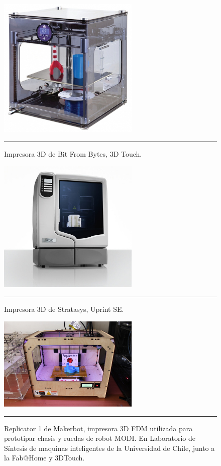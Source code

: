 \begin{figure}[htbp]
	\centering
		\includegraphics[width=0.6\textwidth]{./Figures/3dtouch.jpg}
		\rule{35em}{0.5pt}
	\caption[3DTouch]{Impresora 3D de Bit From Bytes, 3D Touch.}
	\label{fig:3Dtouch}
\end{figure}	

\begin{figure}[htbp]
	\centering
		\includegraphics[width=0.6\textwidth]{./Figures/uprint.jpg}
		\rule{35em}{0.5pt}
	\caption[uprint]{Impresora 3D de Stratasys, Uprint SE.}
	\label{fig:uprint}
\end{figure}	


\begin{figure}[htbp]
	\centering
		\includegraphics[width=0.6\textwidth]{./Figures/replicator1.jpg}
		\rule{35em}{0.5pt}
	\caption[Replicator1]{Replicator 1 de Makerbot, impresora 3D FDM utilizada para prototipar chasis y ruedas de robot MODI. En Laboratorio de Síntesis de maquinas inteligentes de la Universidad de Chile, junto a la Fab@Home y 3DTouch.}
	\label{fig:replicator}
\end{figure}	


